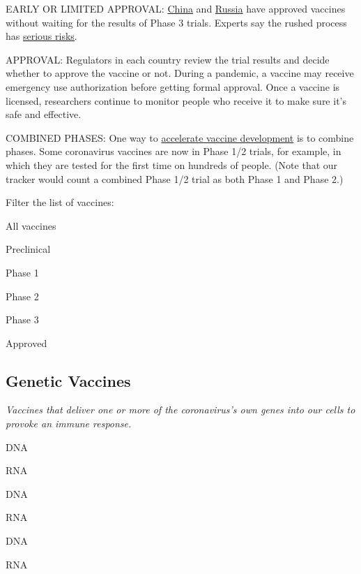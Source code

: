 EARLY OR LIMITED APPROVAL: \protect\hyperlink{cansino}{China} and
\protect\hyperlink{gamaleya}{Russia} have approved vaccines without
waiting for the results of Phase 3 trials. Experts say the rushed
process has
\href{https://www.nytimes3xbfgragh.onion/2020/08/11/health/russia-covid-19-vaccine-safety.html}{serious
risks}.

APPROVAL: Regulators in each country review the trial results and decide
whether to approve the vaccine or not. During a pandemic, a vaccine may
receive emergency use authorization before getting formal approval. Once
a vaccine is licensed, researchers continue to monitor people who
receive it to make sure it's safe and effective.

COMBINED PHASES: One way to
\href{https://www.nytimes3xbfgragh.onion/interactive/2020/04/30/opinion/coronavirus-covid-vaccine.html}{accelerate
vaccine development} is to combine phases. Some coronavirus vaccines are
now in Phase 1/2 trials, for example, in which they are tested for the
first time on hundreds of people. (Note that our tracker would count a
combined Phase 1/2 trial as both Phase 1 and Phase 2.)

Filter the list of vaccines:

All vaccines

Preclinical

Phase 1

Phase 2

Phase 3

Approved

\hypertarget{genetic-vaccines}{%
\subsection{\texorpdfstring{\textbf{Genetic
Vaccines}}{Genetic Vaccines}}\label{genetic-vaccines}}

\emph{Vaccines that deliver one or more of the coronavirus's own genes
into our cells to provoke an immune response.}

DNA

RNA

DNA

RNA

DNA

RNA

